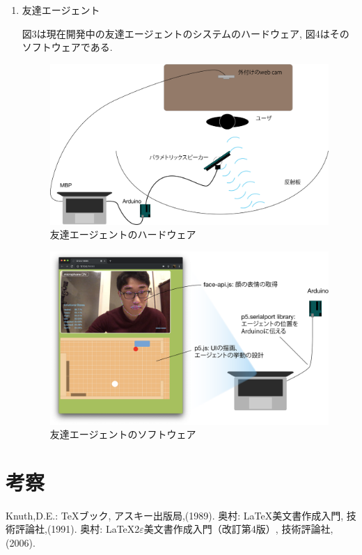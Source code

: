 \documentclass[a4paper,dvipdfmx]{hisken}
\begin{document}
\begin{enumerate}
\item 友達エージェント

図3は現在開発中の友達エージェントのシステムのハードウェア, 図4はそのソフトウェアである. 

\begin{figure}
  \includegraphics[width=\linewidth]{IntimateAgent_hardware.png}
  \caption{友達エージェントのハードウェア}
  \label{fig:detection}
\end{figure}

\begin{figure}
  \includegraphics[width=\linewidth]{IntimaterAgent_software.png}
  \caption{友達エージェントのソフトウェア}
  \label{fig:detection}
\end{figure}




\end{enumerate}


\section{考察}


\begin{thebibliography}{99}
	Knuth,D.E.:
	\TeX{}ブック,
	アスキー出版局,(1989).
	奥村:
	\LaTeX{}美文書作成入門,
	技術評論社,(1991).
    奥村:
    \LaTeX2$\varepsilon$美文書作成入門（改訂第4版）,
    技術評論社,(2006).
\end{thebibliography}





\end{document}
